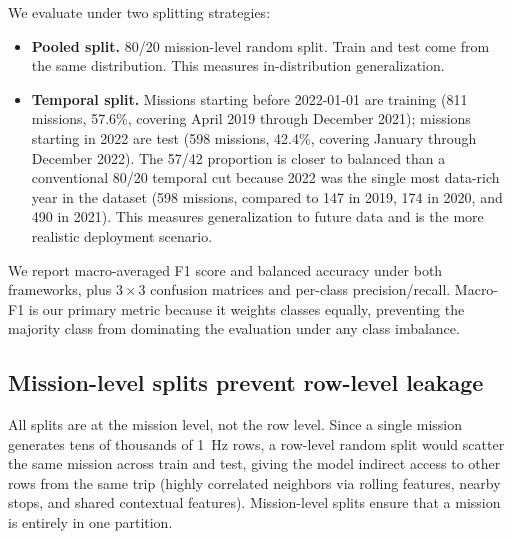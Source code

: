 We evaluate under two splitting strategies:
\begin{itemize}
  \item \textbf{Pooled split.} 80/20 mission-level random split. Train and
    test come from the same distribution. This measures in-distribution
    generalization.
  \item \textbf{Temporal split.} Missions starting before 2022-01-01 are
    training (811 missions, 57.6\%, covering April 2019 through
    December 2021); missions starting in 2022 are test (598 missions,
    42.4\%, covering January through December 2022). The 57/42
    proportion is closer to balanced than a conventional 80/20 temporal
    cut because 2022 was the single most data-rich year in the dataset
    (598 missions, compared to 147 in 2019, 174 in 2020, and 490 in
    2021). This measures generalization to future data and is the more
    realistic deployment scenario.
\end{itemize}

We report macro-averaged F1 score and balanced accuracy under both
frameworks, plus $3\times 3$ confusion matrices and per-class
precision/recall. Macro-F1 is our primary metric because it weights classes
equally, preventing the majority class from dominating the evaluation under
any class imbalance.

\subsection{Mission-level splits prevent row-level leakage}

All splits are at the mission level, not the row level. Since a single
mission generates tens of thousands of 1~Hz rows, a row-level random split
would scatter the same mission across train and test, giving the model
indirect access to other rows from the same trip (highly correlated
neighbors via rolling features, nearby stops, and shared contextual
features). Mission-level splits ensure that a mission is entirely in one
partition.
